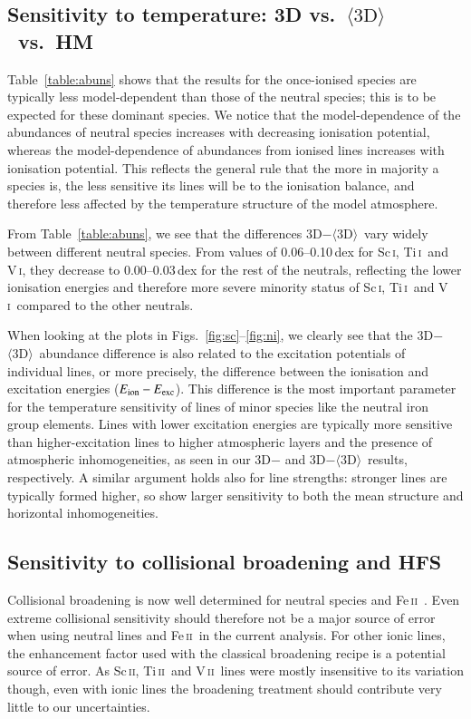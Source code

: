 \documentclass[traditabstract]{aa}
\newcommand{\oneDAV}{$\langle\mathrm{3D}\rangle$}
\newcommand{\altsci}{Sc\,\textsc{i}}
\newcommand{\altscii}{Sc\,\textsc{ii}}
\newcommand{\alttii}{Ti\,\textsc{i}}
\newcommand{\alttiii}{Ti\,\textsc{ii}}
\newcommand{\altvi}{V\,\textsc{i}}
\newcommand{\altvii}{V\,\textsc{ii}}
\newcommand{\altfeii}{Fe\,\textsc{ii}}
\newcommand{\tii}{\alttii\ }
\newcommand{\tiii}{\alttiii\ }
\newcommand{\vi}{\altvi\ }
\newcommand{\vii}{\altvii\ }
\newcommand{\feii}{\altfeii\ }
\begin{document}
\subsection{Sensitivity to temperature: 3D vs.\ \oneDAV\ vs.\ HM}
\label{sensitivity}

Table~\ref{table:abuns} shows that the results for the once-ionised species 
are typically less model-dependent than those of the neutral species; this is to be expected for these 
dominant species.  We notice that the model-dependence of the abundances of neutral species increases 
with decreasing ionisation potential, whereas the model-dependence of abundances from ionised lines 
increases with ionisation potential.  This reflects the general rule that 
the more in majority a species is, the less sensitive its lines will be to the ionisation balance,
and therefore less affected by the temperature structure of the model atmosphere.
   
From Table~\ref{table:abuns}, we see that the differences 3D$-$\oneDAV\ vary widely between different neutral species. From values of 0.06--0.10\,dex for \altsci, \tii and \altvi, they decrease to 0.00--0.03\,dex for the rest of the neutrals, reflecting the lower ionisation energies and therefore more severe minority status of \altsci, \tii and \vi compared to the other neutrals.

When looking at the plots in Figs.~\ref{fig:sc}--\ref{fig:ni}, we clearly see that the 3D$-$\oneDAV\ abundance
difference is also related to the excitation potentials of individual lines, or
more precisely, the difference between the ionisation and excitation
energies ($E_{\rm ion}-E_{\rm exc}$).  This difference is the most important parameter for the
temperature sensitivity of lines of minor species like the
neutral iron group elements. Lines with lower excitation energies are typically more sensitive than higher-excitation
lines to 
 higher atmospheric layers and the presence of atmospheric inhomogeneities, as seen in our 3D$-$ and 3D$-$\oneDAV\ results, respectively. 
A similar argument holds also for line strengths: stronger lines are typically formed higher, so 
show larger sensitivity to both the mean structure and horizontal inhomogeneities.

\subsection{Sensitivity to collisional broadening and HFS}
\label{controls}

Collisional broadening is now well determined for neutral species and \feii \citep{Anstee95, Barklem97, 
Barklem98, Barklem00, 2005A&A...435..373B}.  Even extreme collisional sensitivity should therefore not be a major source of error when using neutral lines and \feii in the current analysis.  For other ionic lines, the enhancement factor used with the classical \citet{Unsold} broadening recipe is a potential source of error.  As \altscii, \tiii and \vii lines were mostly insensitive to its variation though, even with ionic lines the broadening treatment should contribute very little to our uncertainties.
\end{document}

